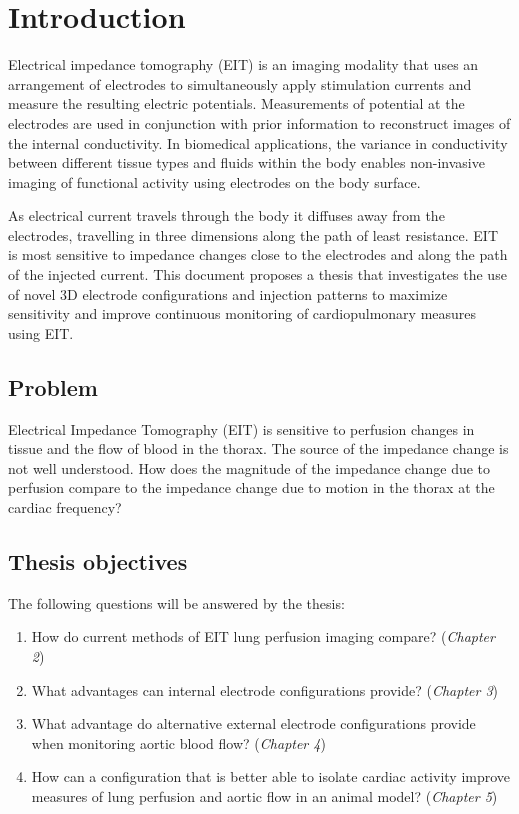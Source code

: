 \chapter{Introduction}

Electrical impedance tomography (EIT) is an imaging modality that uses an arrangement of electrodes to simultaneously apply 
stimulation currents and measure 
the resulting electric potentials. Measurements of potential at the electrodes are used in conjunction with 
prior information to reconstruct images 
of the internal conductivity. In biomedical applications, the variance in conductivity between different 
tissue types and fluids within the body enables non-invasive imaging of functional activity using electrodes on the 
body surface.

As electrical current travels through the body it diffuses away from the electrodes,
travelling in three dimensions along the path of least resistance. 
EIT is most sensitive to impedance changes close to the electrodes 
and along the path of the injected current.
This document proposes a thesis that investigates the use of novel 3D electrode 
configurations and injection patterns to maximize sensitivity and improve continuous monitoring 
of cardiopulmonary measures using EIT.

\section{Problem}

Electrical Impedance Tomography (EIT) is sensitive to perfusion 
changes in tissue and the flow of blood in the thorax.
The source of the impedance change is not well understood. 
How does the magnitude of the impedance change due to perfusion
compare to the impedance change due to motion in the thorax at the cardiac frequency? 





\section{Thesis objectives}
The following questions will be answered by the thesis:
\begin{enumerate}
	\item How do current methods of EIT lung perfusion imaging compare? (\emph{Chapter 2})
	\item What advantages can internal electrode configurations provide? (\emph{Chapter 3})
\item What advantage do alternative external electrode configurations provide
	when monitoring aortic blood flow? (\emph{Chapter 4})
\item How can a configuration that is better able to isolate cardiac activity
	improve measures of lung perfusion and aortic flow in an animal model? (\emph{Chapter 5})
\end{enumerate}

